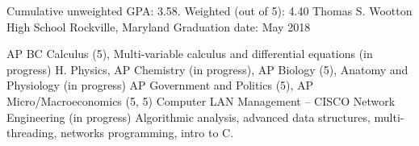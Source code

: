 

\begin{cventries}

  \cventry %
    {Cumulative unweighted GPA: 3.58. Weighted (out of 5): 4.40} %
    {Thomas S. Wootton High School} %
    {Rockville, Maryland} %
    {Graduation date: May 2018} %
    {
    \begin{cvsklist}
    	{ AP BC Calculus (5), Multi-variable calculus and differential equations (in progress)}
        {H. Physics, AP Chemistry (in progress), AP Biology (5), Anatomy and Physiology (in progress)}
        {AP Government and Politics (5), AP Micro/Macroeconomics (5, 5)}
        {Computer LAN Management – CISCO Network Engineering (in progress)}
        {Algorithmic analysis, advanced data structures, multi-threading, networks programming, intro to C.}
    \end{cvsklist}
    }

\end{cventries}
